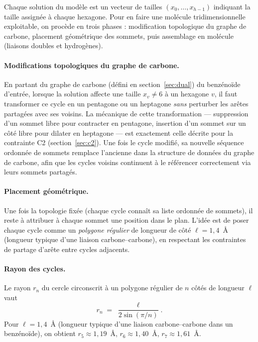 \documentclass[11pt,a4paper]{article}
\begin{document}
Chaque solution du modèle est un vecteur de tailles $(x_0, \dots, x_{h-1})$
indiquant la taille assignée à chaque hexagone. Pour en faire une molécule
tridimensionnelle exploitable, on procède en trois phases : modification
topologique du graphe de carbone, placement géométrique des sommets, puis
assemblage en molécule (liaisons doubles et hydrogènes).

\paragraph{Modifications topologiques du graphe de carbone.}

En partant du graphe de carbone (défini en section~\ref{sec:dual}) du
benzénoïde d'entrée, lorsque la solution affecte une taille $x_v \neq 6$
à un hexagone $v$, il faut transformer ce cycle en un pentagone ou un
heptagone \emph{sans} perturber les arêtes partagées avec ses voisins.
La mécanique de cette transformation --- suppression d'un sommet libre
pour contracter en pentagone, insertion d'un sommet sur un côté libre
pour dilater en heptagone --- est exactement celle décrite pour la
contrainte C2 (section~\ref{sec:c2}). Une fois le cycle modifié, sa
nouvelle séquence ordonnée de sommets remplace l'ancienne dans la
structure de données du graphe de carbone, afin que les cycles voisins
continuent à le référencer correctement via leurs sommets partagés.

\paragraph{Placement géométrique.}
\label{sec:placement}

Une fois la topologie fixée (chaque cycle connaît sa liste ordonnée de
sommets), il reste à attribuer à chaque sommet une position dans le plan.
L'idée est de poser chaque cycle comme un \emph{polygone régulier} de longueur
de côté $\ell = 1{,}4$~\AA{} (longueur typique d'une liaison
carbone--carbone), en respectant les contraintes de partage d'arête entre
cycles adjacents.

\paragraph{Rayon des cycles.}
Le rayon $r_n$ du cercle circonscrit à un polygone régulier de $n$ côtés de
longueur $\ell$ vaut
\[
  r_n \;=\; \frac{\ell}{2\sin(\pi/n)}.
\]
Pour $\ell = 1{,}4$~\AA{} (longueur typique d'une liaison carbone--carbone
dans un benzénoïde), on obtient $r_5 \approx 1{,}19$~\AA, $r_6 \approx
1{,}40$~\AA, $r_7 \approx 1{,}61$~\AA.
\end{document}
